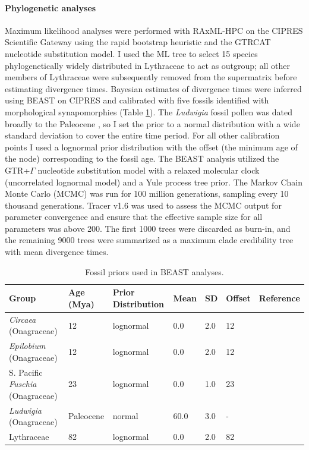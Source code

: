 \documentclass[review]{elsarticle}
\begin{document}
\paragraph{Phylogenetic analyses} 
Maximum likelihood analyses were performed with RAxML-HPC \citep{raxml} on the CIPRES Scientific Gateway \citep{cipres} 
using the rapid bootstrap heuristic and the GTRCAT nucleotide substitution model.
I used the ML tree to select 15 species phylogenetically widely distributed in Lythraceae to act as outgroup; 
all other members of Lythraceae were subsequently removed from the supermatrix before estimating divergence times.
Bayesian estimates of divergence times were inferred using BEAST \citep{beast, beast2} on CIPRES and calibrated with five fossils 
identified with morphological synapomorphies (Table \ref{fossils}).
The \textit{Ludwigia} fossil pollen was dated broadly to the Paleocene \citep{grimsson}, so I set the prior to a normal distribution with a wide 
standard deviation to cover the entire time period.
For all other calibration points I used a lognormal prior distribution with the offset (the minimum age of the node) corresponding to the fossil age.
The BEAST analysis utilized the GTR+$\Gamma$ nucleotide substitution model with a relaxed molecular clock (uncorrelated lognormal model)
and a Yule process tree prior.
The Markov Chain Monte Carlo (MCMC) was run for 100 million generations, sampling every 10 thousand generations.
Tracer v1.6 \citep{tracer} was used to assess the MCMC output for parameter convergence and ensure that the effective sample size for all parameters was above 200.
The first 1000 trees were discarded as burn-in, and the remaining 9000 trees were summarized as a maximum clade credibility tree with mean divergence times. 

\begin{table}
   \begin{adjustbox}{max width=\textwidth}
      \begin{tabular}{lllllll}
         \hline
         Group & Age (Mya) & Prior Distribution & Mean & SD & Offset & Reference \\ \hline
         \textit{Circaea} (Onagraceae) & 12 & lognormal & 0.0 & 2.0 & 12 & \citep{grimsson} \\
         \textit{Epilobium} (Onagraceae) & 12 & lognormal & 0.0 & 2.0 & 12 & \citep{grimsson} \\
         S. Pacific \textit{Fuschia} (Onagraceae) & 23 & lognormal & 0.0 & 1.0 & 23 & \citep{lee2013fossil} \\
         \textit{Ludwigia} (Onagraceae) & Paleocene & normal & 60.0 & 3.0 & - & \citep{zhi} \\
         Lythraceae & 82 & lognormal & 0.0 & 2.0 & 82 & \citep{graham} \\
         \hline
      \end{tabular}
   \end{adjustbox}
   \caption{Fossil priors used in BEAST analyses.}
   \label{fossils}
\end{table}
\end{document}
